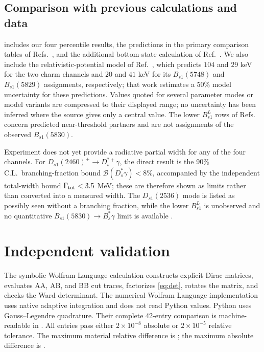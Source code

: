 \documentclass[11pt,a4paper]{article}
\begin{document}
\subsection{Comparison with previous calculations and data}

\clearpage


 includes our four percentile results, the
predictions in the primary comparison tables of
Refs.~\cite{Colangelo2005,Chen2020,Fu2022}, and the additional bottom-state
calculation of Ref.~\cite{Li2021}.  We also include the relativistic-potential
model of Ref.~\cite{BondarMilstein2025}, which predicts $104$ and $29$ keV for
the two charm channels and $20$ and $41$ keV for its $B_{s1}(5748)$ and
$B_{s1}(5829)$ assignments, respectively; that work estimates a 50\% model
uncertainty for these predictions.  Values quoted for several parameter modes
or model variants are compressed to their displayed range; no uncertainty
has been inferred where the source gives only a central value.  The lower
$B_{s1}^{L}$ rows of
Refs.~\cite{Wang2008,Fu2022,BondarMilstein2025,Li2021} concern predicted
near-threshold partners and are not assignments of the observed
$B_{s1}(5830)$.

Experiment does not yet provide a radiative partial width for any of the four
channels.  For $D_{s1}(2460)^+\to D_s^{\ast+}\gamma$, the direct result is the
90\% C.L.\ branching-fraction bound
$\mathcal B(D_s^\ast\gamma)<8\%$, accompanied by the independent total-width
bound $\Gamma_{\rm tot}<3.5$ MeV; these are therefore shown as limits rather
than converted into a measured width.  The $D_{s1}(2536)$ mode is listed as
possibly seen without a branching fraction, while the lower $B_{s1}^{L}$ is
unobserved and no quantitative $B_{s1}(5830)\to B_s^\ast\gamma$ limit is
available \cite{PDG2026}.

\section{Independent validation}

The symbolic Wolfram Language calculation constructs explicit Dirac matrices,
evaluates AA, AB, and BB cut traces, factorizes \cref{eq:det}, rotates the
matrix, and checks the Ward determinant.  The numerical Wolfram Language
implementation uses native adaptive integration and does not read Python
values.  Python uses Gauss--Legendre quadrature.  Their complete
42-entry comparison is machine-readable in
.  All entries pass either
$2\times10^{-8}$ absolute or $2\times10^{-5}$ relative tolerance.  The
maximum material relative difference is \RegressionMaxRel; the maximum
absolute difference is \RegressionMaxAbs.
\end{document}
